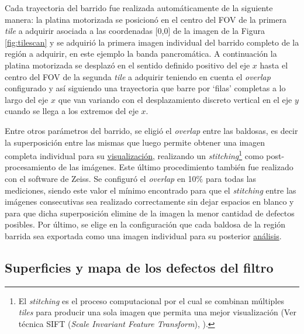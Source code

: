 Cada trayectoria del barrido fue realizada automáticamente de la siguiente manera: la platina motorizada se posicionó en el centro del FOV de la primera \textit{tile} a adquirir asociada a las coordenadas [0,0] de la imagen de la Figura \ref{fig:tilescan} y se adquirió la primera imagen individual del barrido completo de la región a adquirir, en este ejemplo la banda pancromática. A continuación la platina motorizada se desplazó en el sentido definido positivo del eje $x$ hasta el centro del FOV de la segunda \textit{tile} a adquirir teniendo en cuenta el \textit{overlap} configurado y así siguiendo una trayectoria que barre por `filas' completas a lo largo del eje $\textit{x}$ que van variando con el desplazamiento discreto vertical en el eje $\textit{y}$ cuando se llega a los extremos del eje $\textit{x}$.

Entre otros parámetros del barrido, se eligió el \textit{overlap} entre las baldosas, es decir la superposición entre las mismas que luego permite obtener una imagen completa individual para su \underline{visualización},  realizando un \textit{stitching}\footnote{El \textit{stitching} es el proceso computacional por el cual se combinan múltiples \textit{tiles} para
producir una sola imagen que permita una mejor visualización (Ver técnica SIFT (\textit{Scale Invariant Feature Transform}), \cite{Lowe}).} como post-procesamiento de las imágenes. Este último procedimiento también fue realizado con el software de Zeiss. Se configuró el \textit{overlap} en 10$\%$ para todas las mediciones, siendo este valor el mínimo encontrado para que el \textit{stitching} entre las imágenes consecutivas sea realizado correctamente sin dejar espacios en blanco y para que dicha superposición elimine de la imagen la menor cantidad de defectos posibles. Por último, se elige en la configuración que cada baldosa de la región barrida sea exportada como una imagen individual para su posterior \underline{análisis}.

\singlespacing
\subsection{Superficies y mapa de los defectos del filtro}
\label{subs:compl}

